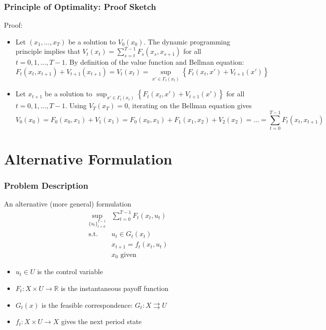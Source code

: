 \documentclass[9pt,aspectratio=169]{beamer}
\newcommand{\R}{\mathbb{R}}
\begin{document}
\begin{frame}
    \frametitle{Principle of Optimality: Proof Sketch}
    Proof:
    \begin{itemize}
        \item Let $(x_1, \ldots, x_T)$ be a solution to $V_0(x_0)$. The
        dynamic programming principle implies that $V_t(x_t) =
        \sum_{s=t}^{T-1} F_s(x_s, x_{s+1})$ for all $t=0,1,\ldots,T-1$.
        By definition of the value function and Bellman equation:
        \begin{equation*}
            F_t(x_t, x_{t+1}) + V_{t+1}(x_{t+1}) = V_{t}(x_t) = \sup_{x' \in
              \Gamma_t(x_t)} \left\{ F_t(x_t, x') + V_{t+1}(x') \right\}
        \end{equation*}
        \item Let $x_{t+1}$ be a solution to $\sup_{x' \in \Gamma_t(x_t)}
        \left\{ F_t(x_t, x') + V_{t+1}(x') \right\}$ for all $t = 0, 1,
        \ldots, T-1$. Using $V_T(x_T)=0$, iterating on the Bellman equation gives
        \begin{equation*}
            V_0(x_0) = F_0(x_0, x_1) + V_1(x_1) = F_0(x_0, x_1) + F_1(x_1,
            x_2) + V_2(x_2) = \ldots = \sum_{t=0}^{T-1} F_t(x_t, x_{t+1})
        \end{equation*}
    \end{itemize}
\end{frame}

\section{Alternative Formulation}

\begin{frame}
    \frametitle{Problem Description}
    An alternative (more general) formulation
    \begin{align*}
        \sup_{\{u_t\}_{t=0}^{T-1}} &\sum_{t=0}^{T-1}F_t(x_t, u_t)\\
        \text{s.t. }
        &u_t \in G_t(x_t) \\
        &x_{t+1} = f_t(x_t, u_t)\\
        &x_0 \text{ given}
    \end{align*}
    \small
    \begin{itemize}
        \item $u_t \in U$ is the control variable
        \item $F_t:X \times U \to \R$ is the instantaneous payoff function
        \item $G_t(x)$ is the feasible correspondence:
        $G_t: X \rightrightarrows U$
        \item $f_t: X \times U \to X$ gives the next period state
    \end{itemize}
\end{frame}
\end{document}
